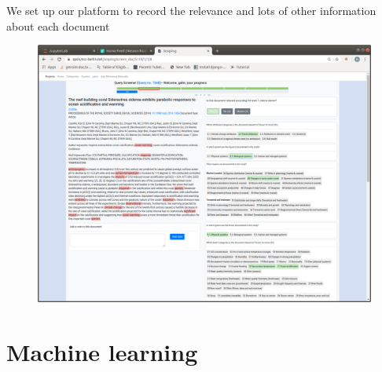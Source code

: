 \documentclass[9pt]{beamer}
\begin{document}
\begin{frame}{We set up our platform to record the relevance and lots of other information about each document}

\begin{figure}
	\includegraphics[width=\linewidth]{../plots/screening-platform}
\end{figure}

\end{frame}

\section{Machine learning}

\end{document}

